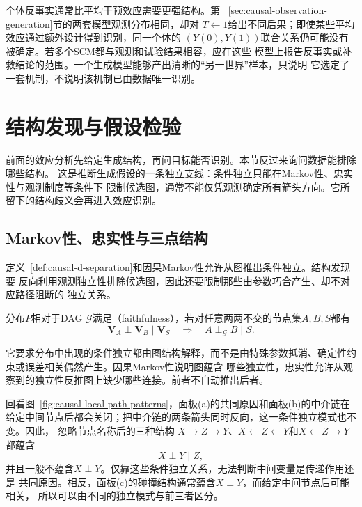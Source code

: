 个体反事实通常比平均干预效应需要更强结构。第
~\ref{sec:causal-observation-generation}节的两套模型观测分布相同，却对
\(T\leftarrow1\)给出不同后果；即使某些平均效应通过额外设计得到识别，同一个体的
\((Y(0),Y(1))\)联合关系仍可能没有被确定。若多个SCM都与观测和试验结果相容，应在这些
模型上报告反事实或补救结论的范围。一个生成模型能够产出清晰的“另一世界”样本，只说明
它选定了一套机制，不说明该机制已由数据唯一识别。

\section{结构发现与假设检验}
\label{sec:causal-structure-discovery}

前面的效应分析先给定生成结构，再问目标能否识别。本节反过来询问数据能排除哪些结构。
这是推断生成假设的一条独立支线：条件独立只能在Markov性、忠实性与观测制度等条件下
限制候选图，通常不能仅凭观测确定所有箭头方向。它所留下的结构歧义会再进入效应识别。

\subsection{Markov性、忠实性与三点结构}

定义~\ref{def:causal-d-separation}和因果Markov性允许从图推出条件独立。结构发现要
反向利用观测独立性排除候选图，因此还要限制那些由参数巧合产生、却不对应路径阻断的
独立关系。

\begin{definition}[相对于DAG的忠实性]
  \label{def:causal-faithfulness}
  分布\(P\)相对于DAG \(\mathcal G\)满足（faithfulness），若对任意两两不交的节点集\(A,B,S\)都有
  \[ \bm V_A\perp\bm V_B\mid\bm V_S
       \quad\Longrightarrow\quad A\perp_{\mathcal G}B\mid S. \]
\end{definition}
它要求分布中出现的条件独立都由图结构解释，而不是由特殊参数抵消、确定性约束或误差相关偶然产生。因果Markov性说明图蕴含
哪些独立性，忠实性允许从观察到的独立性反推图上缺少哪些连接。前者不自动推出后者。

回看图~\ref{fig:causal-local-path-patterns}，面板(a)的共同原因和面板(b)的中介链在
给定中间节点后都会关闭；把中介链的两条箭头同时反向，这一条件独立模式也不变。因此，
忽略节点名称后的三种结构
\(X\to Z\to Y\)、\(X\leftarrow Z\leftarrow Y\)和\(X\leftarrow Z\to Y\)都蕴含
\[
  X\perp Y\mid Z,
\]
并且一般不蕴含\(X\perp Y\)。仅靠这些条件独立关系，无法判断中间变量是传递作用还是
共同原因。相反，面板(c)的碰撞结构通常蕴含\(X\perp Y\)，而给定中间节点后可能相关，
所以可以由不同的独立模式与前三者区分。

